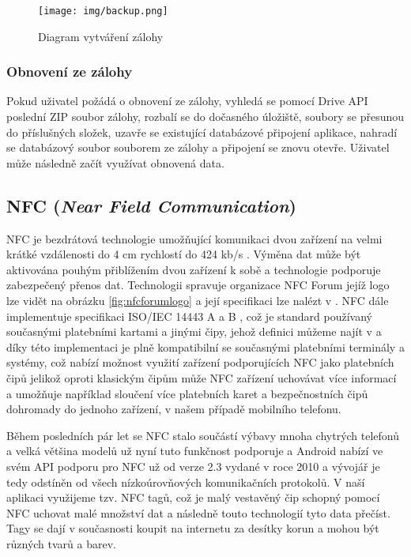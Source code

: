 \documentclass[czech,master,public,dept460,male,java,cpdeclaration]{diploma}
\begin{document}
\begin{figure}[H]
        \centering
                \texttt{[image: img/backup.png]}
        \caption{Diagram vytváření zálohy}
        \label{fig:backup}
\end{figure}

\subsubsection{Obnovení ze zálohy}
Pokud uživatel požádá o obnovení ze zálohy, vyhledá se pomocí Drive API poslední ZIP soubor zálohy,
rozbalí se do dočasného úložiště, soubory se přesunou do příslušných složek, uzavře se existující
databázové připojení aplikace, nahradí se databázový soubor souborem ze zálohy a připojení se znovu otevře.
Uživatel může následně začít využívat obnovená data.

\subsection{NFC (\textit{Near Field Communication})}\label{nfcsection}
NFC je bezdrátová technologie umožňující komunikaci dvou zařízení na velmi krátké vzdálenosti do 4 cm
rychlostí do 424 kb/s \cite{nfcforum}. Výměna dat může být aktivována pouhým přiblížením dvou zařízení k sobě
a technologie podporuje zabezpečený přenos dat. Technologii spravuje organizace NFC Forum jejíž logo lze vidět
na obrázku \ref{fig:nfcforumlogo} a její specifikaci lze nalézt v \cite{nfciso}.
NFC dále implementuje specifikaci ISO/IEC 14443 A a B \cite{nfcforum}, což je standard používaný
současnými platebními kartami a jinými čipy, jehož definici můžeme najít v \cite{rfidiso} a díky této
implementaci je plně kompatibilní se současnými platebními terminály a systémy, což nabízí možnost využití zařízení
podporujících NFC jako platebních čipů jelikož oproti klasickým čipům může NFC zařízení uchovávat více informací
a umožňuje například sloučení více platebních karet a bezpečnostních čipů dohromady do jednoho zařízení,
v našem případě mobilního telefonu.

Během posledních pár let se NFC stalo součástí výbavy mnoha chytrých telefonů a velká většina modelů
už nyní tuto funkčnost podporuje a Android nabízí ve svém API podporu pro NFC už od verze 2.3
vydané v roce 2010 a vývojář je tedy odstíněn od všech nízkoúrovňových komunikačních protokolů.
V naší aplikaci využijeme tzv. NFC tagů, což je malý vestavěný čip schopný pomocí NFC uchovat malé množství dat a
následně touto technologií tyto data přečíst. Tagy se dají v současnosti koupit na internetu za desítky
korun a mohou být různých tvarů a barev.
\end{document}
